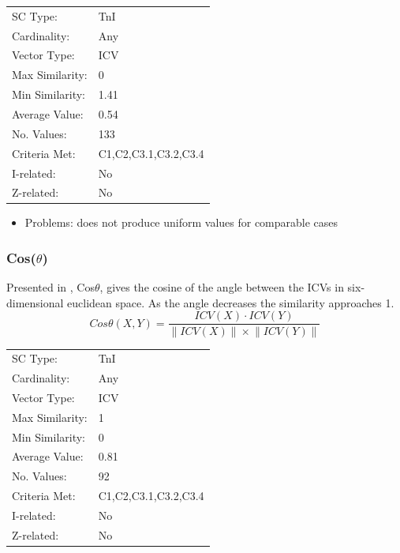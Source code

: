 \documentclass{article}
\begin{document}
\begin{center}
\begin{tabular}{ll}
 SC Type:         &  TnI                   \\
 Cardinality:     &  Any                   \\
 Vector Type:     &  ICV                   \\
 Max Similarity:  &  0                     \\
 Min Similarity:  &  1.41                  \\
 Average Value:   &  0.54                  \\
 No. Values:      &  133                   \\
 Criteria Met:    &  C1,C2,C3.1,C3.2,C3.4  \\
 I-related:       &  No                    \\
 Z-related:       &  No                    \\
\end{tabular}
\end{center}


\begin{itemize}
\item Problems: does not produce uniform values for comparable cases
\end{itemize}
\subsubsection{Cos($\theta$)}
\label{sec-13-4-3}

Presented in \citet{Rogers1992}, Cos$\theta$, gives the cosine of the
angle between the ICVs in six-dimensional euclidean space. As the
angle decreases the similarity approaches 1.
$$Cos\theta(X,Y)=\frac{ICV(X)\cdot ICV(Y)}{\left\|ICV(X)\right\|\times\left\|ICV(Y)\right\|}$$

\begin{center}
\begin{tabular}{ll}
 SC Type:         &  TnI                   \\
 Cardinality:     &  Any                   \\
 Vector Type:     &  ICV                   \\
 Max Similarity:  &  1                     \\
 Min Similarity:  &  0                     \\
 Average Value:   &  0.81                  \\
 No. Values:      &  92                    \\
 Criteria Met:    &  C1,C2,C3.1,C3.2,C3.4  \\
 I-related:       &  No                    \\
 Z-related:       &  No                    \\
\end{tabular}
\end{center}
\end{document}
